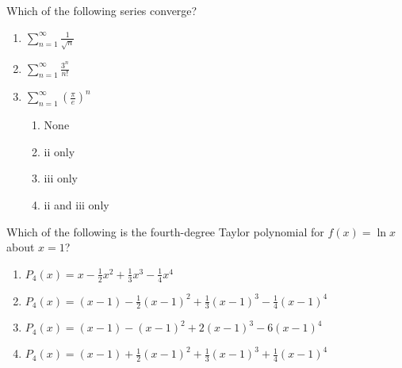 \documentclass[
]{article}
\begin{document}
\begin{enumerate}
\begin{minipage}{\linewidth}
\item
  Which of the following series converge?

	\vspace{2ex}
  \begin{enumerate}
		\setlength{\itemsep}{2ex}  \def\labelenumii{\arabic{enumii}.}
    \item
    \(\displaystyle \sum_{n=1}^\infty \frac{1}{\sqrt n}\)
  \item
    \(\displaystyle \sum_{n=1}^\infty \frac{3^n}{n!}\)
  \item
    \(\displaystyle \sum_{n=1}^\infty \left(\frac{\pi}{e}\right)^n\)

    \begin{enumerate}
			\def\labelenumi{\Alph{enumi}.}
			\item
      None
    \item
      ii only
    \item
      iii only
    \item
      ii and iii only
    \end{enumerate}
  \end{enumerate}
	\vspace{0.25in}

\end{minipage}

\begin{minipage}{\linewidth}
\item
  Which of the following is the fourth-degree Taylor polynomial for
  \(f(x) = \ln x\) about \(x=1\)?
	\vspace{2ex}
  \begin{enumerate}
		\setlength{\itemsep}{2ex}
		\def\labelenumi{\Alph{enumi}.}
		\item
    \(P_4(x) = x - \frac12 x^2 + \frac13 x^3-\frac14 x^4\)
    \item \(P_4(x) = (x-1) - \frac12(x-1)^2 + \frac13(x-1)^3-\frac14(x-1)^4\)
  \item
    \(P_4(x) = (x-1) - (x-1)^2 + 2(x-1)^3-6(x-1)^4\)
  \item
    \(P_4(x) = (x-1) + \frac12(x-1)^2 + \frac13(x-1)^3+\frac14(x-1)^4\)

  \end{enumerate}
	\vspace{0.75in}

\end{minipage}

\end{enumerate}
\end{document}
